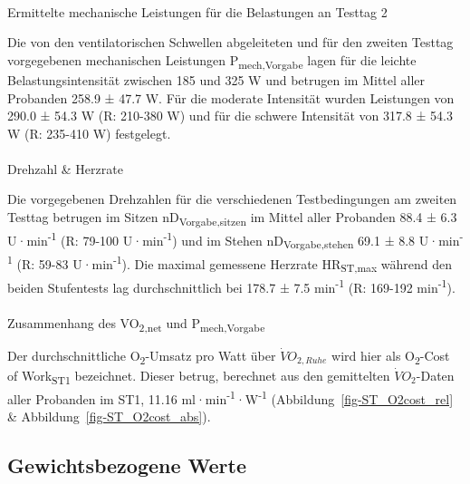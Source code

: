 \documentclass[
  letterpaper,
  DIV=11]{scrartcl}
\makeatletter
\let\oldparagraph\paragraph
\renewcommand{\paragraph}{
    \@ifstar
      \xxxParagraphStar
      \xxxParagraphNoStar
  }
\newcommand{\xxxParagraphStar}[1]{\oldparagraph*{#1}\mbox{}}
\newcommand{\xxxParagraphNoStar}[1]{\oldparagraph{#1}\mbox{}}
\makeatother
\begin{document}
\paragraph{Ermittelte mechanische Leistungen für die Belastungen an
Testtag
2}\label{ermittelte-mechanische-leistungen-fuxfcr-die-belastungen-an-testtag-2}

Die von den ventilatorischen Schwellen abgeleiteten und für den zweiten
Testtag vorgegebenen mechanischen Leistungen
P\textsubscript{mech,Vorgabe} lagen für die leichte Belastungsintensität
zwischen 185 und 325 W und betrugen im Mittel aller Probanden 258.9 ±
47.7 W. Für die moderate Intensität wurden Leistungen von 290.0 ± 54.3 W
(R: 210-380 W) und für die schwere Intensität von 317.8 ± 54.3 W (R:
235-410 W) festgelegt.

\paragraph{Drehzahl \& Herzrate}\label{drehzahl-herzrate}

Die vorgegebenen Drehzahlen für die verschiedenen Testbedingungen am
zweiten Testtag betrugen im Sitzen nD\textsubscript{Vorgabe,sitzen} im
Mittel aller Probanden 88.4 ± 6.3 U·min\textsuperscript{-1} (R: 79-100
U·min\textsuperscript{-1}) und im Stehen
nD\textsubscript{Vorgabe,stehen} 69.1 ± 8.8 U·min\textsuperscript{-1}
(R: 59-83 U·min\textsuperscript{-1}). Die maximal gemessene Herzrate
HR\textsubscript{ST,max} während den beiden Stufentests lag
durchschnittlich bei 178.7 ± 7.5 min\textsuperscript{-1} (R: 169-192
min\textsuperscript{-1}).

\paragraph{\texorpdfstring{Zusammenhang des VO\textsubscript{2,net} und
P\textsubscript{mech,Vorgabe}}{Zusammenhang des VO2,net und Pmech,Vorgabe}}\label{zusammenhang-des-vo2net-und-pmechvorgabe}

Der durchschnittliche O\textsubscript{2}-Umsatz pro Watt über
\(\dot{V}O_{2,Ruhe}\) wird hier als O\textsubscript{2}-Cost of
Work\textsubscript{ST1} bezeichnet. Dieser betrug, berechnet aus den
gemittelten \(\dot{V}O_{2}\)-Daten aller Probanden im ST1, 11.16
ml·min\textsuperscript{-1}·W\textsuperscript{-1}
(Abbildung~\ref{fig-ST_O2cost_rel} \&
Abbildung~\ref{fig-ST_O2cost_abs}).

\subsection{Gewichtsbezogene Werte}
\end{document}
